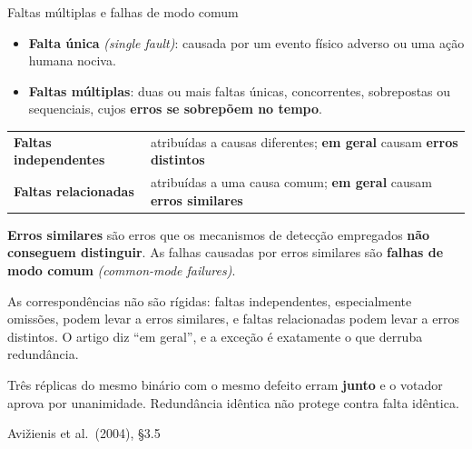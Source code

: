 \documentclass{beamer}
\newcommand{\en}[1]{{\color{depCinza}\textit{#1}}}
\newcommand{\sect}[1]{\par\smallskip\hfill{\tiny\color{black!55}Avi\v{z}ienis et al.\ (2004), #1}}
\begin{document}
\begin{frame}{Faltas m\'ultiplas e falhas de modo comum}
    \footnotesize
    \begin{itemize}
        \item \textbf{Falta \'unica} \en{(single fault)}: causada por um evento f\'isico adverso ou uma a\c{c}\~ao humana nociva.
        \item \textbf{Faltas m\'ultiplas}: duas ou mais faltas \'unicas, concorrentes, sobrepostas ou sequenciais, cujos \textbf{erros se sobrep\~oem no tempo}.
    \end{itemize}
    \medskip
    \begin{tabularx}{\linewidth}{@{}p{3.5cm} >{\raggedright\arraybackslash}X@{}}
        \toprule
        \textbf{Faltas independentes} & atribu\'idas a causas diferentes; \textbf{em geral} causam \textbf{erros distintos} \\
        \textbf{Faltas relacionadas} & atribu\'idas a uma causa comum; \textbf{em geral} causam \textbf{erros similares} \\
        \bottomrule
    \end{tabularx}
    \medskip
    \begin{defi}
        \scriptsize
        \textbf{Erros similares} s\~ao erros que os mecanismos de detec\c{c}\~ao empregados \textbf{n\~ao conseguem distinguir}. As falhas causadas por erros similares s\~ao \textbf{falhas de modo comum} \en{(common-mode failures)}.
    \end{defi}
    \medskip
    \begin{armadilha}
        \scriptsize
        As correspond\^encias n\~ao s\~ao r\'igidas: faltas independentes, especialmente omiss\~oes, podem levar a erros similares, e faltas relacionadas podem levar a erros distintos. O artigo diz ``em geral'', e a exce\c{c}\~ao \'e exatamente o que derruba redund\^ancia.
    \end{armadilha}
    \medskip
    \begin{ancora}
        \footnotesize
        Tr\^es r\'eplicas do mesmo bin\'ario com o mesmo defeito erram \textbf{junto} e o votador aprova por unanimidade. Redund\^ancia id\^entica n\~ao protege contra falta id\^entica.
    \end{ancora}
    \sect{\S3.5}
\end{frame}
\end{document}
